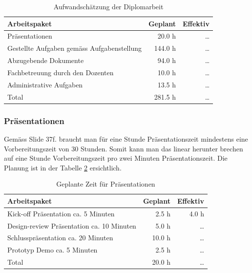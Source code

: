   \begin{table}[ht]
    \sffamily 
    \begin{center}
      \begin{tabular}{p{9cm}rr}
        \toprule
        Arbeitspaket & Geplant & Effektiv \\
        \midrule
        Präsentationen &
        20.0 h &
        \ldots\\
        Gestellte Aufgaben gemäss Aufgabenstellung &
        144.0 h &
        \ldots\\
        Abzugebende Dokumente &
        94.0 h &
        \ldots\\
        Fachbetreuung durch den Dozenten &
        10.0 h &
        \ldots\\
        Administrative Aufgaben &
        13.5 h &
        \ldots\\
        \bottomrule
        Total &
        281.5 h &
        \ldots\\
        \bottomrule
      \end{tabular}
      \caption{Aufwandschätzung der Diplomarbeit}
      \label{tab:planing}
    \end{center}
  \end{table}
  
  \subsubsection{Präsentationen}
  
  Gemäss \cite{KillerPresentation} Slide 37f. braucht man für eine Stunde
  Präsentationszeit mindestens eine Vorbereitungszeit von 30 Stunden. Somit kann
  man das linear herunter brechen auf eine Stunde Vorbereitungszeit pro zwei
  Minuten Präsentationszeit. Die Planung ist in der Tabelle
  \ref{tab:presentationPlaning} ersichtlich.
  \newline
  
  \begin{table}[ht]
    \sffamily 
    \begin{center}
      \begin{tabular}{p{9cm}rr}
        \toprule
        Arbeitspaket & Geplant & Effektiv \\
        \midrule
        Kick-off Präsentation ca. 5 Minuten &
        2.5 h &
        4.0 h\\
        Design-review Präsentation ca. 10 Minuten &
        5.0 h &
        \ldots\\
        Schlusspräsentation ca. 20 Minuten &
        10.0 h &
        \ldots\\
        Prototyp Demo ca. 5 Minuten &
        2.5 h &
        \ldots\\
        \bottomrule
        Total &
        20.0 h &
        \ldots\\
        \bottomrule
      \end{tabular}
      \caption{Geplante Zeit für Präsentationen}
      \label{tab:presentationPlaning}
    \end{center}
  \end{table}
  
